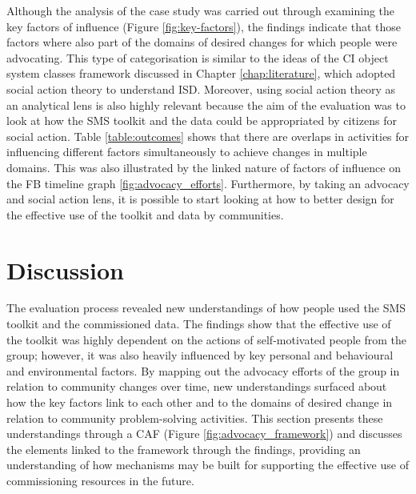 Although the analysis of the case study was carried out through examining the key factors of influence (Figure \ref{fig:key-factors}), the findings indicate that those factors where also part of the domains of desired changes for which people were advocating. This type of categorisation is similar to the ideas of the CI object system classes framework \citep{stillman_community_2009,hirschheim_exploring_1996} discussed in Chapter \ref{chap:literature}, which adopted social action theory to understand ISD. Moreover, using social action theory as an analytical lens is also highly relevant because the aim of the evaluation was to look at how the SMS toolkit and the data could be appropriated by citizens for social action. Table \ref{table:outcomes} shows that there are overlaps in activities for influencing different factors simultaneously to achieve changes in multiple domains. This was also illustrated by the linked nature of factors of influence on the FB timeline graph \ref{fig:advocacy_efforts}. Furthermore, by taking an advocacy and social action lens, it is possible to start looking at how to better design for the effective use of the toolkit and data by communities.

\section{Discussion}
The evaluation process revealed new understandings of how people used the SMS toolkit and the commissioned data. The findings show that the effective use of the toolkit was highly dependent on the actions of self-motivated people from the group; however, it was also heavily influenced by key personal and behavioural and environmental factors. By mapping out the advocacy efforts of the group in relation to community changes over time, new understandings surfaced about how the key factors link to each other and to the domains of desired change in relation to community problem-solving activities. This section presents these understandings through a CAF (Figure \ref{fig:advocacy_framework}) and discusses the elements linked to the framework through the findings, providing an understanding of how mechanisms may be built for supporting the effective use of commissioning resources in the future.

